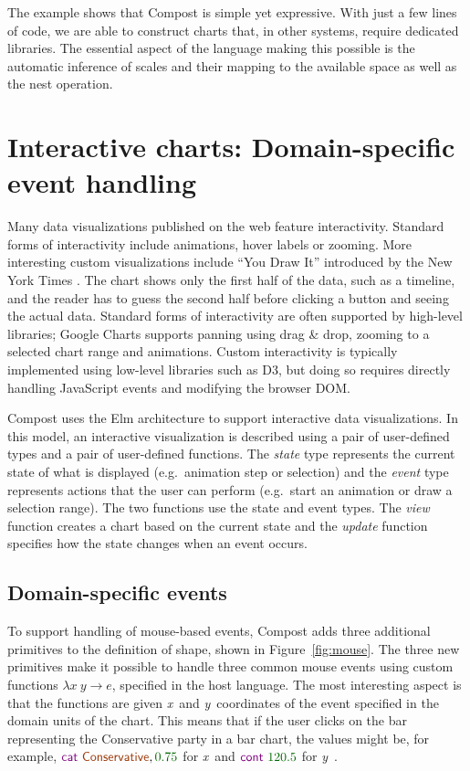 \documentclass{jfp}
\newcommand{\X}{\emph{x}\ }
\newcommand{\Y}{\emph{y}\ }
\newcommand{\num}[1]{\textcolor{numclr}{#1}}
\newcommand{\strf}[1]{\textnormal{\textcolor{strclr}{\sffamily #1}}}
\newcommand{\kvd}[1]{\textnormal{\textcolor{kvdclr}{\sffamily #1}}}
\begin{document}
The example shows that Compost is simple yet expressive. With just
a few lines of code, we are able to construct charts that, in other systems, require dedicated
libraries. The essential aspect of the language making this possible is the automatic inference
of scales and their mapping to the available space as well as the \kvd{nest} operation.


\section{Interactive charts: Domain-specific event handling}
Many data visualizations published on the web feature interactivity. Standard forms of
interactivity include animations, hover labels or zooming. More interesting custom
visualizations include ``You Draw It'' introduced by the New York Times \cite{youdraw}.
The chart shows only the first half of the data, such as a timeline, and the reader has to
guess the second half before clicking a button and seeing the actual data. Standard forms of
interactivity are often supported by high-level libraries; Google Charts supports panning
using drag \& drop, zooming to a selected chart range and animations. Custom interactivity is
typically implemented using low-level libraries such as D3, but doing so requires directly handling
JavaScript events and modifying the browser DOM.

Compost uses the Elm architecture \cite{mvu} to support interactive data visualizations.
In this model, an interactive visualization is described using a pair of user-defined types
and a pair of user-defined functions. The \emph{state} type represents the current state of what
is displayed (e.g.~animation step or selection) and the \emph{event} type represents actions that
the user can perform (e.g.~start an animation or draw a selection range). The two functions
use the state and event types. The \emph{view} function creates a chart based on the current
state and the \emph{update} function specifies how the state changes when an event occurs.

\subsection{Domain-specific events}

To support handling of mouse-based events, Compost adds three additional primitives to the definition
of shape, shown in Figure~\ref{fig:mouse}. The three new primitives make it possible to handle
three common mouse events using custom functions $\lambda x~y\rightarrow e$, specified in the
host language. The most interesting aspect is that the functions are given \X and \Y coordinates
of the event specified in the domain units of the chart. This means that if the user clicks on the
bar representing the Conservative party in a bar chart, the values might be, for example,
$\kvd{cat}~\strf{Conservative},\num{0.75}$ for \X and $\kvd{cont}~\num{120.5}$ for \Y.
\end{document}

